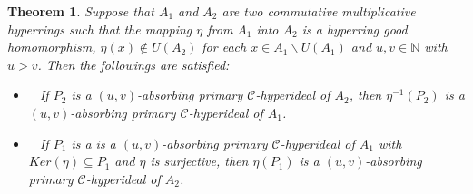 \documentclass[preprint,review,10pt]{amsart}
\newtheorem{theorem}{Theorem}[section]
\theoremstyle{definition}
\theoremstyle{remark}
\numberwithin{equation}{section}
\begin{document}
\begin{theorem} \label{homo} 
Suppose that $A_1$ and $A_2$ are two commutative multiplicative hyperrings such that the mapping $\eta$ from $ A_1$ into $ A_2$ is a hyperring
good homomorphism,  $\eta(x) \notin U(A_2)$ for each $x \in A_1 \backslash U(A_1)$ and $u,v \in \mathbb{N}$ with $u >v$. Then the followings are satisfied:
\begin{itemize}
\item[\rm{(i)}]~ If $P_2$ is a $(u,v)$-absorbing primary $\mathcal{C}$-hyperideal of $A_2$, then $\eta^{-1}(P_2)$ is a $(u,v)$-absorbing primary  $\mathcal{C}$-hyperideal of $A_1$.
\item[\rm{(ii)}]~ If  $P_1$ is a is a $(u,v)$-absorbing primary $\mathcal{C}$-hyperideal of $A_1$ with $Ker (\eta) \subseteq P_1$ and $\eta$ is surjective, then $\eta(P_1)$ is a $(u,v)$-absorbing primary  $\mathcal{C}$-hyperideal of $A_2$.
\end{itemize}
\end{theorem}
\end{document}
